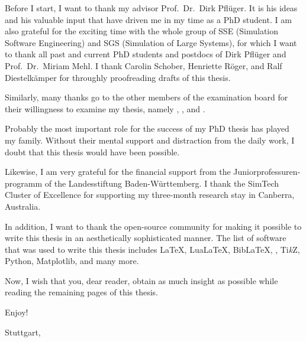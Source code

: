 
Before I start, I want to thank my advisor Prof.\ Dr.\ Dirk Pflüger.
It is his ideas and his valuable input that have driven me in
my time as a PhD student.
I am also grateful for the exciting time with the whole group of
SSE (Simulation Software Engineering) and
SGS (Simulation of Large Systems),
for which I want to thank all past and current PhD students and postdocs of
Dirk Pflüger and Prof.\ Dr.\ Miriam Mehl.
I thank
Carolin Schober,
Henriette Röger, and
Ralf Diestelkämper
for throughly proofreading
drafts of this thesis.

Similarly, many thanks go to the other members of the
examination board for their willingness to examine my thesis,
namely \theexamineri{}, \theexaminerii{}, and \theexamineriii{}.

Probably the most important role for the success of my PhD thesis
has played my family.
Without their mental support and distraction from the daily work,
I doubt that this thesis would have been possible.

Likewise, I am very grateful for the financial support from
the \foreignlanguage{ngerman}{Juniorprofessurenprogramm} of the
\foreignlanguage{ngerman}{Landesstiftung Baden-Württemberg}.
I thank the SimTech Cluster of Excellence for supporting
my three-month research stay in Canberra, Australia.

In addition, I want to thank the open-source community for making it possible to
write this thesis in an aesthetically sophisticated manner.
The list of software that was used to write this thesis includes
\LaTeX, Lua\LaTeX, Bib\LaTeX,
\scalebox{0.9}{\KOMAScript}, Ti\emph{k}Z, Python, Matplotlib,
and many more.

\label{page:preface}
Now, I wish that you, dear reader, obtain as much insight as possible
while reading the remaining
 pages of this thesis.

Enjoy!

\vspace{1em}

\noindent
Stuttgart, \thedate

\noindent
\theauthor
